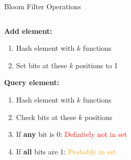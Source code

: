 \begin{frame}{Bloom Filter Operations}
  \begin{columns}
    \begin{column}{0.5\textwidth}
      \textbf{Add element:}
      \begin{enumerate}
        \item Hash element with $k$ functions
        \item Set bits at these $k$ positions to 1
      \end{enumerate}

      \textbf{Query element:}
      \begin{enumerate}
        \item Hash element with $k$ functions
        \item Check bits at these $k$ positions
        \item If \textbf{any} bit is 0: \textcolor{red}{Definitely not in set}
        \item If \textbf{all} bits are 1: \textcolor{orange}{Probably in set}
      \end{enumerate}
    \end{column}
    \begin{column}{0.5\textwidth}
    \end{column}
  \end{columns}
\end{frame}

